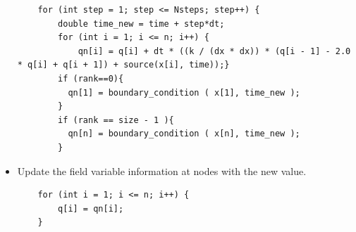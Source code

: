 \documentclass[12pt]{article}
\begin{document}
\begin{itemize}
    \begin{verbatim}
    for (int step = 1; step <= Nsteps; step++) {
        double time_new = time + step*dt; 
        for (int i = 1; i <= n; i++) {
            qn[i] = q[i] + dt * ((k / (dx * dx)) * (q[i - 1] - 2.0 * q[i] + q[i + 1]) + source(x[i], time));}
        if (rank==0){
          qn[1] = boundary_condition ( x[1], time_new );
        }
        if (rank == size - 1 ){
          qn[n] = boundary_condition ( x[n], time_new );
        }
    \end{verbatim}
    \item Update the field variable information at nodes with the new value.
    \begin{verbatim}
    for (int i = 1; i <= n; i++) {
        q[i] = qn[i];
    }
    \end{verbatim}
\end{itemize}
\end{document}
